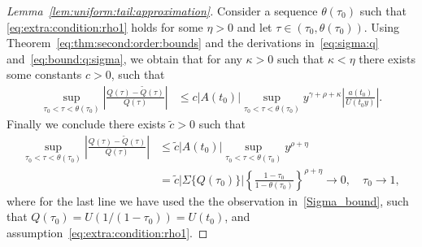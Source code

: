 \documentclass{statsoc}
\theoremstyle{break}
\newcommand{\tauzero}{\tau_0}
\newcommand{\tzero}{t_0}
\begin{document}
\begin{proof}[Lemma~\ref{lem:uniform:tail:approximation}]
Consider a sequence $\theta(\tauzero)$ such that \eqref{eq:extra:condition:rho1} holds for some $\eta>0$ and let $\tau \in (\tau_0, \theta(\tau_0) )$. Using Theorem~\ref{eq:thm:second:order:bounds} and the derivations in~\eqref{eq:sigma:q} and~\eqref{eq:bound:q:sigma}, 
we obtain that for any $\kappa  > 0$ such that $\kappa < \eta$ there exists some constants $c>0$, such that
\begin{align*}
	\sup_{\tau_0 < \tau < \theta(\tau_0) }\left| \frac{ Q(\tau) - \tilde Q(\tau)} { Q(\tau)}   \right| &\leq  c |A(\tzero)| \sup_{\tau_0 < \tau < \theta(\tau_0) } y^{\gamma+\rho+\kappa }
	\left|  \frac{a(t_0)}{U(t_0 y ) } \right|. 
\end{align*}
Finally we conclude there exists $\tilde c > 0$ such that
\begin{align*}
	\sup_{\tau_0 < \tau < \theta(\tau_0) }\left| \frac{ Q(\tau) - \tilde Q(\tau)} { Q(\tau)}   \right| &\leq  \tilde c |A(\tzero)| \sup_{\tau_0 < \tau < \theta(\tau_0) } y^{\rho+\eta}\\
	& = \tilde c |\Sigma\{Q(\tau_0)\}| \left\{ \frac{1-\tau_0}{1-\theta(\tau_0)} \right\}^{\rho + \eta} \to 0, \quad \tauzero \to 1,
\end{align*}
where for the last line we have used the the observation in~\eqref{Sigma_bound}, such that $Q(\tau_0) = U(1/(1-\tau_0))= U(t_0)$,
and assumption~\eqref{eq:extra:condition:rho1}.
\end{proof}
\end{document}
